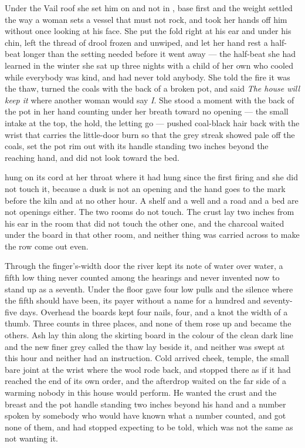 Under the Vail roof she set him on  and not in , base first and the weight settled the way a woman sets a vessel that must not rock, and took her hands off him without once looking at his face. She put the fold right at his ear and under his chin, left the thread of drool frozen and unwiped, and let her hand rest a half-beat longer than the setting needed before it went away --- the half-beat she had learned in the winter she sat up three nights with a child of her own who cooled while everybody was kind, and had never told anybody. She told the fire it was the thaw, turned the coals with the back of a broken pot, and said \emph{The house will keep it} where another woman would say \emph{I}. She stood a moment with the back of the pot in her hand counting under her breath toward no opening --- the small intake at the top, the hold, the letting go --- pushed coal-black hair back with the wrist that carries the little-door burn so that the grey streak showed pale off the coals, set the pot rim out with its handle standing two inches beyond the reaching hand, and did not look toward the bed.

 hung on its cord at her throat where it had hung since the first firing and she did not touch it, because a dusk is not an opening and the hand goes to the mark before the kiln and at no other hour. A shelf and a well and a road and a bed are not openings either. The two rooms do not touch. The crust lay two inches from his ear in the room that did not touch the other one, and the charcoal waited under the board in that other room, and neither thing was carried across to make the row come out even.

Through the finger's-width door the river kept its note of water over water, a fifth low thing never counted among the hearings and never invented now to stand up as a seventh. Under the floor  gave four low pulls and the silence where the fifth should have been, its payer without a name for a hundred and seventy-five days. Overhead the boards kept four nails, four, and a knot the width of a thumb. Three counts in three places, and none of them rose up and became the others. Ash lay thin along the skirting board in the colour of the clean dark line and the new finer grey called the thaw lay beside it, and neither was swept at this hour and neither had an instruction. Cold arrived cheek, temple, the small bare joint at the wrist where the wool rode back, and stopped there as if it had reached the end of its own order, and the afterdrop waited on the far side of a warming nobody in this house would perform. He wanted the crust and the breast and the pot handle standing two inches beyond his hand and a number spoken by somebody who would have known what a number counted, and got none of them, and had stopped expecting to be told, which was not the same as not wanting it.

